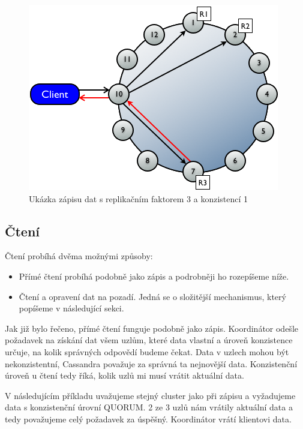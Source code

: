 \begin{figure}[h]
\centering
\includegraphics[scale=0.5]{images/write}
\caption{Ukázka zápisu dat s replikačním faktorem 3 a konzistencí 1}
\label{fig:vnodes}
\end{figure}


\subsection{Čtení}
Čtení probíhá dvěma možnými způsoby:

\begin{itemize}
\item Přímé čtení probíhá podobně jako zápis a podrobněji ho rozepíšeme níže.
\item Čtení a opravení dat na pozadí. Jedná se o složitější mechanismus, který popíšeme v následující sekci.
\end{itemize}

Jak již bylo řečeno, přímé čtení funguje podobně jako zápis. Koordinátor odešle požadavek na získání dat všem uzlům, které data vlastní a úroveň konzistence určuje, na kolik správných odpovědí budeme čekat. Data v uzlech mohou být nekonzistentní, Cassandra považuje za správná ta nejnovější data. Konzistenční úroveň u čtení tedy říká, kolik uzlů mi musí vrátit aktuální data. 

V následujícím příkladu uvažujeme stejný cluster jako při zápisu a vyžadujeme data s konzistenční úrovní QUORUM. 2 ze 3 uzlů nám vrátily aktuální data a tedy považujeme celý požadavek za úspěšný. Koordinátor vrátí klientovi data.


